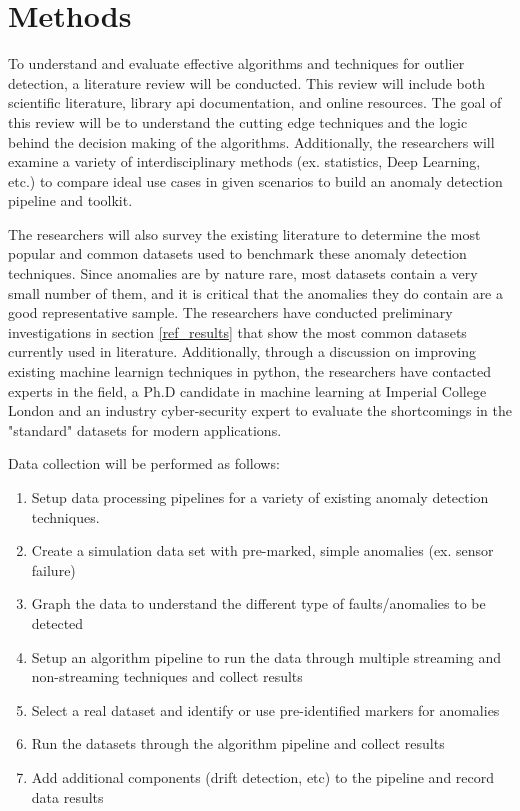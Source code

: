 \section{Methods}
\label{ref_methods}

To understand and evaluate effective algorithms and techniques for outlier detection, a literature review will be conducted. This review will include both scientific literature, library api documentation, and online resources. The goal of this review will be to understand the cutting edge techniques and the logic behind the decision making of the algorithms. Additionally, the researchers will examine a variety of interdisciplinary methods (ex. statistics, Deep Learning, etc.) to compare ideal use cases in given scenarios to build an anomaly detection pipeline and toolkit.  

The researchers will also survey the existing literature to determine the most popular and common datasets used to benchmark these anomaly detection techniques. Since anomalies are by nature rare, most datasets contain a very small number of them, and it is critical that the anomalies they do contain are a good representative sample. The researchers have conducted preliminary investigations in section \ref{ref_results} that show the most common datasets currently used in literature.  Additionally, through a discussion on improving existing machine learnign techniques in python, the researchers have contacted experts in the field, a Ph.D candidate in machine learning at Imperial College London and an industry cyber-security expert to evaluate the shortcomings in the "standard" datasets for modern applications. 

Data collection will be performed as follows:
\begin{enumerate}
    \item Setup data processing pipelines for a variety of existing anomaly detection techniques.
    \item Create a simulation data set with pre-marked, simple anomalies (ex. sensor failure) 
    \item Graph the data to understand the different type of faults/anomalies to be detected
    \item Setup an algorithm pipeline to run the data through multiple streaming and non-streaming techniques and collect results
    \item Select a real dataset and identify or use pre-identified markers for anomalies
    \item Run the datasets through the algorithm pipeline and collect results
    \item Add additional components (drift detection, etc) to the pipeline and record data results 
\end{enumerate}

